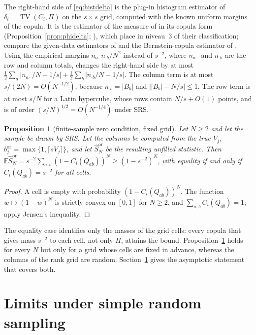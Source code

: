 \documentclass[11pt,a4paper]{article}
\newtheorem{proposition}[theorem]{Proposition}
\theoremstyle{definition}
\theoremstyle{remark}
\newcommand{\E}{\mathbb{E}}
\newcommand{\TV}{\operatorname{TV}}
\begin{document}
The right-hand side of \eqref{eq:histdelta} is the plug-in histogram estimator of $\delta_i=\TV(C_i,\Pi)$ on the $s\times s$ grid, computed with the known uniform margins of the copula. It is the estimator of the measure of \citet{borgonovo2007} in its copula form (Proposition~\ref{prop:phidelta}; \citealp{wei2014copula}), which \citet[Equation~30]{plischke2019} place in niveau~3 of their classification; compare the given-data estimators of \citet{plischke2013} and the Bernstein-copula estimator of \citet[Section~4]{plischke2019}. Using the empirical margins $n_{a\cdot}n_{\cdot b}/N^2$ instead of $s^{-2}$, where $n_{a\cdot}$ and $n_{\cdot b}$ are the row and column totals, changes the right-hand side by at most $\frac12\sum_a|n_{a\cdot}/N-1/s|+\frac12\sum_b|n_{\cdot b}/N-1/s|$. The column term is at most $s/(2N)=O(N^{-1/2})$, because $n_{\cdot b}=|B_b|$ and $\big||B_b|-N/s\big|\le1$. The row term is at most $s/N$ for a Latin hypercube, whose rows contain $N/s+O(1)$ points, and is of order $(s/N)^{1/2}=O(N^{-1/4})$ under SRS.

\begin{proposition}[finite-sample zero condition, fixed grid]\label{prop:finiteN}
Let $N\ge2$ and let the sample be drawn by SRS. Let the columns be computed from the true $V_j$, $b_j^{\mathrm{or}}=\max\{1,\lceil sV_j\rceil\}$, and let $\hat S^{\mathrm{or}}_N$ be the resulting unfilled statistic. Then $\E\hat S^{\mathrm{or}}_N=s^{-2}\sum_{a,b}(1-C_i(Q_{ab}))^N\ge(1-s^{-2})^N$, with equality if and only if $C_i(Q_{ab})=s^{-2}$ for all cells.
\end{proposition}

\begin{proof}
A cell is empty with probability $(1-C_i(Q_{ab}))^N$. The function $w\mapsto(1-w)^N$ is strictly convex on $[0,1]$ for $N\ge2$, and $\sum_{a,b}C_i(Q_{ab})=1$; apply Jensen's inequality.
\end{proof}

The equality case identifies only the masses of the grid cells: every copula that gives mass $s^{-2}$ to each cell, not only $\Pi$, attains the bound. Proposition~\ref{prop:finiteN} holds for every $N$ but only for a grid whose cells are fixed in advance, whereas the columns of the rank grid are random. Section~\ref{sec:limits} gives the asymptotic statement that covers both.

\section{Limits under simple random sampling}\label{sec:limits}
\end{document}
